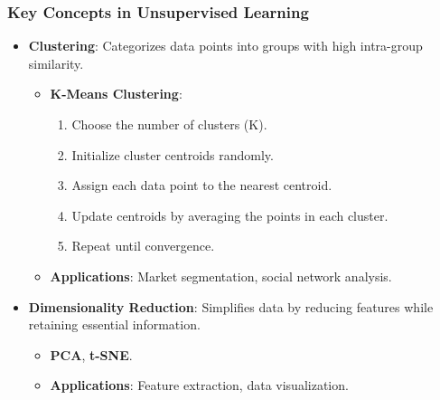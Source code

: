 \documentclass[aspectratio=169]{beamer}
\begin{document}
\begin{frame}[fragile]
    \frametitle{Key Concepts in Unsupervised Learning}
    \begin{itemize}
        \item \textbf{Clustering}: Categorizes data points into groups with high intra-group similarity.
        \begin{itemize}
            \item \textbf{K-Means Clustering}:
            \begin{enumerate}
                \item Choose the number of clusters (K).
                \item Initialize cluster centroids randomly.
                \item Assign each data point to the nearest centroid.
                \item Update centroids by averaging the points in each cluster.
                \item Repeat until convergence.
            \end{enumerate}
            \item \textbf{Applications}: Market segmentation, social network analysis.
        \end{itemize}
        
        \item \textbf{Dimensionality Reduction}: Simplifies data by reducing features while retaining essential information.
        \begin{itemize}
            \item \textbf{PCA}, \textbf{t-SNE}.
            \item \textbf{Applications}: Feature extraction, data visualization.
        \end{itemize}
    \end{itemize}
\end{frame}
\end{document}
